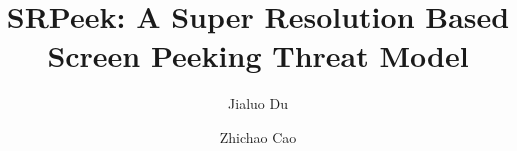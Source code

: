 \documentclass[sigconf]{acmart}
\begin{document}
\title{SRPeek: A Super Resolution Based Screen Peeking Threat Model}

\author{Jialuo Du}

\author{Zhichao Cao}




\maketitle


















\end{document}
